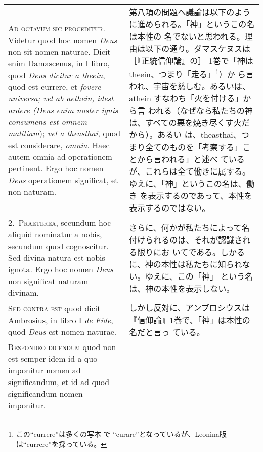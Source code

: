 \documentclass[10pt]{jsarticle} %
\begin{document}
\begin{longtable}{p{21em}p{21em}}


{\huge A}{\scshape d octavum sic proceditur}. Videtur quod hoc nomen
{\itshape Deus} non sit nomen naturae. Dicit enim Damascenus, in I libro, quod
{\itshape Deus dicitur a theein}, quod est currere, et {\itshape fovere
universa; vel ab aethein, idest ardere (Deus enim noster ignis consumens
est omnem malitiam}); {\itshape vel a theasthai}, quod est considerare,
{\itshape omnia}. Haec autem omnia ad operationem pertinent. Ergo hoc
nomen {\itshape Deus} operationem significat, et non naturam.


&

第八項の問題へ議論は以下のように進められる。「神」というこの名は本性の
名でないと思われる。理由は以下の通り。ダマスケヌスは［『正統信仰論』の］
1巻で「神はtheein、つまり「走る」\footnote{この``currere''は多くの写本
で ``curare''となっているが、Leonina版は``currere''を採っている。}）か
ら言われ、宇宙を慈しむ。あるいは、athein すなわち「火を付ける」から言
われる（なぜなら私たちの神は、すべての悪を焼き尽くす火だから）。あるい
は、theasthai、つまり全てのものを「考察する」ことから言われる」と述べ
ているが、これらは全て働きに属する。ゆえに、「神」というこの名は、働き
を表示するのであって、本性を表示するのではない。

\\


2.~{\scshape Praeterea}, secundum hoc aliquid nominatur a nobis,
secundum quod cognoscitur. Sed divina natura est nobis ignota. Ergo
hoc nomen {\itshape Deus} non significat naturam divinam.


&

さらに、何かが私たちによって名付けられるのは、それが認識される限りにお
いてである。しかるに、神の本性は私たちに知られない。ゆえに、この「神」
という名は、神の本性を表示しない。

\\


{\scshape Sed contra est} quod dicit Ambrosius, in
libro I {\itshape de Fide}, quod {\itshape Deus} est nomen naturae.

&

しかし反対に、アンブロシウスは『信仰論』1巻で、「神」は本性の名だと言っ
ている。

\\


{\scshape Respondeo dicendum} quod non est semper idem id
a quo imponitur nomen ad significandum, et id ad quod significandum
nomen imponitur. 



\end{longtable}
\end{document}
